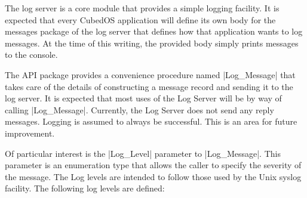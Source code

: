 The log server is a core module that provides a simple logging facility. It is expected that
every CubedOS application will define its own body for the messages package of the log server
that defines how that application wants to log messages. At the time of this writing, the
provided body simply prints messages to the console.

The API package provides a convenience procedure named |Log_Message| that takes care of the
details of constructing a message record and sending it to the log server. It is expected that
most uses of the Log Server will be by way of calling |Log_Message|. Currently, the Log Server
does not send any reply messages. Logging is assumed to always be successful. This is an area
for future improvement.

Of particular interest is the |Log_Level| parameter to |Log_Message|. This parameter is an
enumeration type that allows the caller to specify the severity of the message. The Log levels
are intended to follow those used by the Unix syslog facility. The following log levels are
defined:

